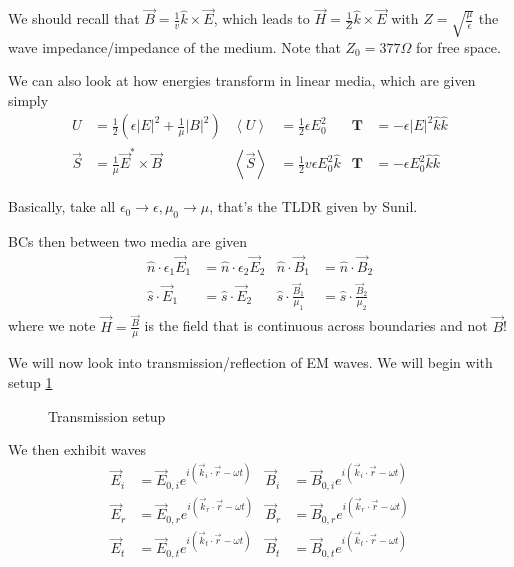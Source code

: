 \documentclass[10pt]{report}
\newcommand{\expvalue}[1]{\left<#1\right>}
\newcommand{\abs}[1]{\left|#1\right|}
\begin{document}
We should recall that $\vec{B} = \frac{1}{v}\hat{k} \times \vec{E}$, which leads to $\vec{H} = \frac{1}{Z}\hat{k} \times \vec{E}$ with $Z = \sqrt{\frac{\mu}{\epsilon}}$ the wave impedance/impedance of the medium. Note that $Z_0 = 377\Omega$ for free space.

We can also look at how energies transform in linear media, which are given simply
\begin{align}
    U &= \frac{1}{2}\left( \epsilon \abs{E}^2 + \frac{1}{\mu}\abs{B}^2 \right) & \expvalue{U} &= \frac{1}{2}\epsilon E_0^2 & \mathbf{T} &= -\epsilon \abs{E}^2 \hat{k} \hat{k}\\
    \vec{S} &= \frac{1}{\mu}\vec{E}^*\times \vec{B} & \expvalue{\vec{S}} &= \frac{1}{2}v\epsilon E_0^2 \hat{k} & \mathbf{T} &= -\epsilon E_0^2 \hat{k} \hat{k}
\end{align}

Basically, take all $\epsilon_0 \to \epsilon, \mu_0 \to \mu$, that's the TLDR given by Sunil.

BCs then between two media are given
\begin{align}
    \hat{n} \cdot \epsilon_1 \vec{E}_1 &= \hat{n} \cdot \epsilon_2 \vec{E}_2 & \hat{n} \cdot \vec{B}_1 &= \hat{n}\cdot \vec{B}_2\\
    \hat{s} \cdot \vec{E}_1 &= \hat{s} \cdot \vec{E}_2 & \hat{s} \cdot \frac{\vec{B}_1}{\mu_1} &= \hat{s} \cdot \frac{\vec{B}_2}{\mu_2}
\end{align}
where we note $\vec{H} = \frac{\vec{B}}{\mu}$ is the field that is continuous across boundaries and not $\vec{B}$!

We will now look into transmission/reflection of EM waves. We will begin with setup \ref{5.1.transmission}
\begin{figure}[!h]
    \centering
    \caption{Transmission setup}
    \label{5.1.transmission}
\end{figure}

We then exhibit waves
\begin{align}
    \vec{E}_i &= \vec{E}_{0,i}e^{i(\vec{k}_i \cdot \vec{r} - \omega t)} & \vec{B}_i &= \vec{B}_{0,i}e^{i(\vec{k}_i \cdot \vec{r} - \omega t)}\\
    \vec{E}_r &= \vec{E}_{0,r} e^{i(\vec{k}_r \cdot \vec{r} - \omega t)} & \vec{B}_r &= \vec{B}_{0,r}e^{i(\vec{k}_r \cdot \vec{r} - \omega t)}\\
    \vec{E}_t &= \vec{E}_{0,t}e^{i(\vec{k}_t \cdot \vec{r} - \omega t)} & \vec{B}_t &= \vec{B}_{0,t}e^{i(\vec{k}_t \cdot \vec{r} - \omega t)}
\end{align}
\end{document}
